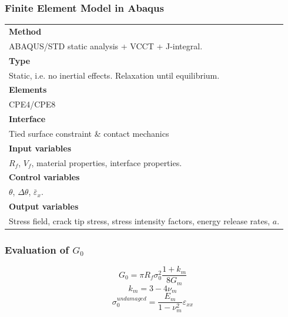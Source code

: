 \documentclass[first,firstsupp,lastsupp,handout,last,hyperref,table]{ETHclass}
\begin{document}
\begin{frame}
\frametitle{Finite Element Model in Abaqus}
\vspace{-0.7cm}
\centering
\captionsetup[figure]{font=scriptsize,labelfont=scriptsize}
\begin{table}[h!]
\scriptsize
  \centering
    \begin{tabularx}{\textwidth}{X}
    \toprule
    \midrule    
    \textbf{Method}\\
    ABAQUS/STD static analysis + VCCT + J-integral.\\
    \midrule
    \textbf{Type}\\
    Static, i.e. no inertial effects. Relaxation until equilibrium.\\
    \midrule
    \textbf{Elements}\\
    CPE4/CPE8\\
    \midrule
    \textbf{Interface}\\
    Tied surface constraint \& contact mechanics\\
    \midrule
   \textbf{Input variables}\\
    $R_{f}$, $V_{f}$, material properties, interface properties.\\
    \midrule
    \textbf{Control variables}\\
    $\theta$, $\Delta\theta$, $\bar{\varepsilon}_{x}$.\\
    \midrule
 \textbf{Output variables} \\
  Stress field, crack tip stress, stress intensity factors, energy release rates, $a$.\\
  \midrule
    \bottomrule
    \end{tabularx}%
  \label{tab:analysis_tab}%
\end{table}
\end{frame}

\begin{frame}
\frametitle{\small Evaluation of $G_{0}$}
\vspace{-0.7cm}
\footnotesize
\centering
\captionsetup[figure]{font=scriptsize,labelfont=scriptsize}
\begin{equation}
G_{0}=\pi R_{f}\sigma^{2}_{0}\frac{1+k_{m}}{8G_{m}}
\end{equation}
\begin{equation}
k_{m}=3-4\nu_{m}
\end{equation}
\begin{equation}
\sigma_{0}^{undamaged}=\frac{E_{m}}{1-\nu^{2}_{m}}\varepsilon_{xx}
\end{equation}%
\end{frame}
\end{document}
